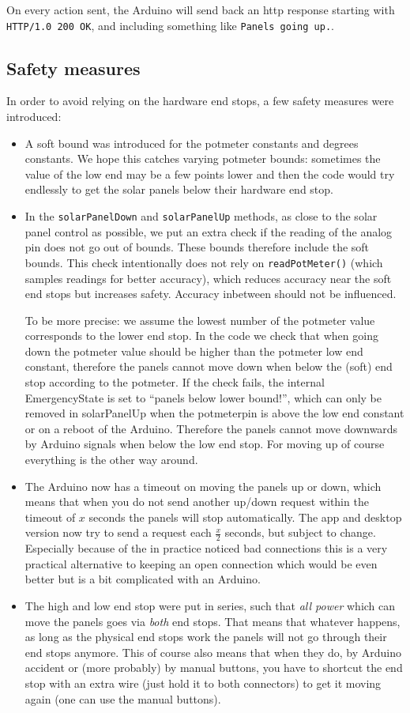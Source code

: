 \documentclass{article}
\begin{document}
			On every action sent, the Arduino will send back an http response starting with \verb|HTTP/1.0 200 OK|, and including something like \verb|Panels going up.|.
			
		\subsection{Safety measures}
			In order to avoid relying on the hardware end stops, a few safety measures were introduced:
			\begin{itemize}
				\item A soft bound was introduced for the potmeter constants and degrees constants. We hope this catches varying potmeter bounds: sometimes the value of the low end may be a few points lower and then the code would try endlessly to get the solar panels below their hardware end stop.
				\item In the \verb|solarPanelDown| and \verb|solarPanelUp| methods, as close to the solar panel control as possible, we put an extra check if the reading of the analog pin does not go out of bounds. These bounds therefore include the soft bounds. This check intentionally does not rely on \verb|readPotMeter()| (which samples readings for better accuracy), which reduces accuracy near the soft end stops but increases safety. Accuracy inbetween should not be influenced.
				
				To be more precise: we assume the lowest number of the potmeter value corresponds to the lower end stop. In the code we check that when going down the potmeter value should be higher than the potmeter low end constant, therefore the panels cannot move down when below the (soft) end stop according to the potmeter. If the check fails, the internal EmergencyState is set to ``panels below lower bound!'', which can only be removed in solarPanelUp when the potmeterpin is above the low end constant or on a reboot of the Arduino. Therefore the panels cannot move downwards by Arduino signals when below the low end stop. For moving up of course everything is the other way around.
				\item The Arduino now has a timeout on moving the panels up or down, which means that when you do not send another up/down request within the timeout of $x$ seconds the panels will stop automatically. The app and desktop version now try to send a request each $\frac{x}{2}$ seconds, but subject to change. Especially because of the in practice noticed bad connections this is a very practical alternative to keeping an open connection which would be even better but is a bit complicated with an Arduino.
				\item The high and low end stop were put in series, such that \textit{all power} which can move the panels goes via \textit{both} end stops. That means that whatever happens, as long as the physical end stops work the panels will not go through their end stops anymore. This of course also means that when they do, by Arduino accident or (more probably) by manual buttons, you have to shortcut the end stop with an extra wire (just hold it to both connectors) to get it moving again (one can use the manual buttons).
			\end{itemize}
		
\end{document}
